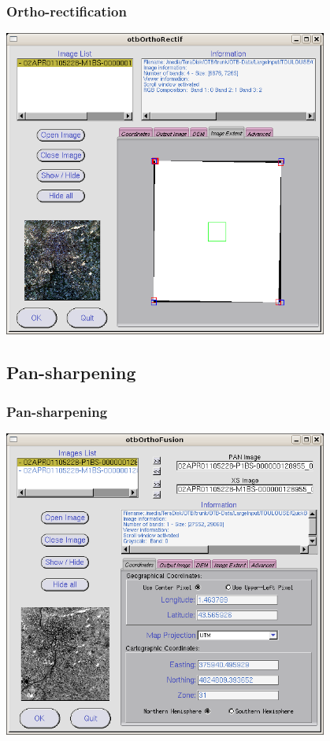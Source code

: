 \documentclass[compress]{beamer}
\begin{document}
\begin{frame}
  \frametitle{Ortho-rectification}
      \begin{center}
      \includegraphics[width=0.80\textwidth]{Images/ortho3.png}
  \end{center}
\end{frame}



\subsection{Pan-sharpening}

\begin{frame}
  \frametitle{Pan-sharpening}
      \begin{center}
      \includegraphics[width=0.80\textwidth]{Images/pansharp.png}
  \end{center}
\end{frame}
\end{document}
